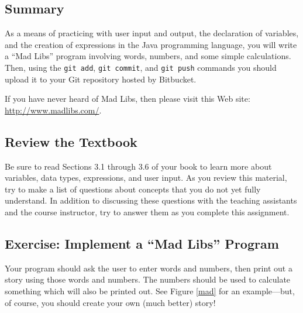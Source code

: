 


\vspace*{-.2in}
\subsection*{Summary}
\vspace*{-.05in}

As a means of practicing with user input and output, the declaration of variables, and the creation of expressions in
the Java programming language, you will write a ``Mad Libs'' program involving words, numbers, and some simple
calculations. Then, using the {\tt git add}, {\tt git commit}, and {\tt git push} commands you should upload it to your
Git repository hosted by Bitbucket.

\noindent
If you have never heard of Mad Libs, then please visit this Web site: \url{http://www.madlibs.com/}.

\vspace*{-.15in}
\subsection*{Review the Textbook}
\vspace*{-.05in}

Be sure to read Sections 3.1 through 3.6 of your book to learn more about variables, data types, expressions, and user
input. As you review this material, try to make a list of questions about concepts that you do not yet fully
understand. In addition to discussing these questions with the teaching assistants and the course instructor, try to
answer them as you complete this assignment.

\vspace*{-.15in}
\subsection*{Exercise: Implement a ``Mad Libs'' Program}
\vspace*{-.05in}
Your program should ask the user to enter words and numbers, then print out a story using those words and numbers. The
numbers should be used to calculate something which will also be printed out. See Figure \ref{mad} for an example---but,
of course, you should create your own (much better) story!

